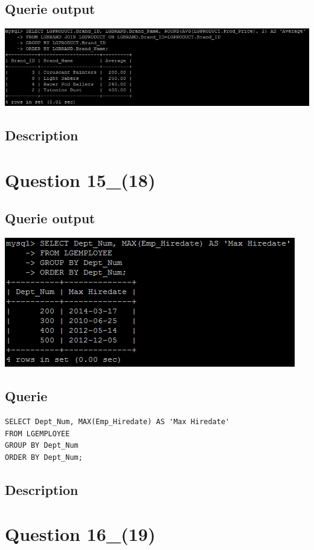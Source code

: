 \documentclass[a4paper,10pt]{article}
\begin{document}
\subsection{Querie output}
           \includegraphics{Queries/Question_14_(17)/Q14_screenshot.jpg}
\subsection{Description}\section*{Question 15_(18)}
\subsection{Querie output}
           \includegraphics{Queries/Question_15_(18)/Q15_screenshot.jpg}
 \subsection{Querie}
          \lstset{
            language=SQL,
            breaklines=true
            }
        \begin{lstlisting}[frame=single]
        SELECT Dept_Num, MAX(Emp_Hiredate) AS 'Max Hiredate'
FROM LGEMPLOYEE
GROUP BY Dept_Num
ORDER BY Dept_Num;

        \end{lstlisting}
\subsection{Description}\section*{Question 16_(19)}
\end{document}
